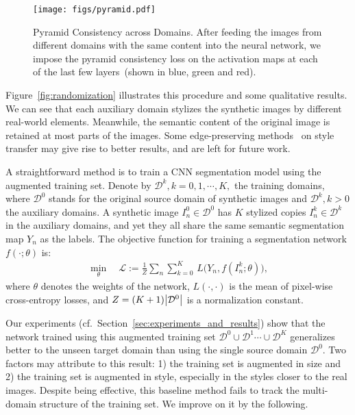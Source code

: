 \documentclass[10pt,twocolumn,letterpaper]{article}
\begin{document}
\begin{figure*}[t]
  \centering
  \texttt{[image: figs/pyramid.pdf]}
  \vspace{2mm}
  \caption{Pyramid Consistency  across Domains. After feeding the images from different domains with the same content  into the neural network, we impose the pyramid consistency loss on the activation maps at each of the last few layers~(shown in blue, green and red).}
  \label{fig:consistency}
  
\end{figure*}


Figure~\ref{fig:randomization} illustrates this procedure and some qualitative results. We can see that each auxiliary domain stylizes the synthetic images by different real-world elements. Meanwhile, the semantic content of the original image is retained at most parts of the images. Some edge-preserving methods~\cite{li2017laplacian} on style transfer may give rise to better results, and are left for future work. 


A straightforward method is to train a CNN segmentation model using the augmented training set. Denote by $\mathcal{D}^k, k=0,1,\cdots,K,$ the training domains, where $\mathcal{D}^0$ stands for the original source domain of synthetic images and $\mathcal{D}^k, k>0$ the auxiliary domains. A synthetic image $I_n^0\in \mathcal{D}^0$ has $K$ stylized copies $I_n^k\in \mathcal{D}^k$ in the auxiliary domains, and yet they all share the same semantic segmentation map $Y_n$ as the labels.  The objective function for training a  segmentation network $f(\cdot;\theta)$ is:
\begin{align}
\min_{\theta} \quad \mathcal{L}:= \frac{1}{Z}\sum_n \sum_{k=0}^{K} \,{L}\Big(Y_n,f(I_n^k;\theta)\Big), \label{eq:baseline}
\end{align}
where $\theta$ denotes the weights of the network,  ${L}(\cdot,\cdot)$ is the mean of pixel-wise cross-entropy losses, and $Z=(K+1)\abs{\mathcal{D}^0}$ is a normalization constant. 

Our experiments (cf.\ Section~\ref{sec:experiments_and_results}) show that the network trained using this augmented training set $\mathcal{D}^0\cup \mathcal{D}^1 \cdots \cup \mathcal{D}^K$ generalizes better to the unseen target domain than using the single source domain $\mathcal{D}^0$. Two factors may attribute to this result: 1) the training set is augmented in size and 2) the training set is augmented in style, especially in the styles closer to the real images. Despite being effective, this baseline method fails to track the multi-domain structure of the training set. We improve on it by the following.
\end{document}
